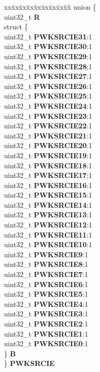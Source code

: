\begin{DoxyCompactItemize}
\begin{tabbing}
\end{tabbing}\item 
\mbox{\label{structCRP__tag_a831969641d81aa672d81f4381f4ee2cd}} 
\begin{tabbing}
xx\=xx\=xx\=xx\=xx\=xx\=xx\=xx\=xx\=\kill
union \{\\
\>uint32\_t {\bfseries R}\\
\>struct \{\\
\>\>uint32\_t {\bfseries PWKSRCIE31}:1\\
\>\>uint32\_t {\bfseries PWKSRCIE30}:1\\
\>\>uint32\_t {\bfseries PWKSRCIE29}:1\\
\>\>uint32\_t {\bfseries PWKSRCIE28}:1\\
\>\>uint32\_t {\bfseries PWKSRCIE27}:1\\
\>\>uint32\_t {\bfseries PWKSRCIE26}:1\\
\>\>uint32\_t {\bfseries PWKSRCIE25}:1\\
\>\>uint32\_t {\bfseries PWKSRCIE24}:1\\
\>\>uint32\_t {\bfseries PWKSRCIE23}:1\\
\>\>uint32\_t {\bfseries PWKSRCIE22}:1\\
\>\>uint32\_t {\bfseries PWKSRCIE21}:1\\
\>\>uint32\_t {\bfseries PWKSRCIE20}:1\\
\>\>uint32\_t {\bfseries PWKSRCIE19}:1\\
\>\>uint32\_t {\bfseries PWKSRCIE18}:1\\
\>\>uint32\_t {\bfseries PWKSRCIE17}:1\\
\>\>uint32\_t {\bfseries PWKSRCIE16}:1\\
\>\>uint32\_t {\bfseries PWKSRCIE15}:1\\
\>\>uint32\_t {\bfseries PWKSRCIE14}:1\\
\>\>uint32\_t {\bfseries PWKSRCIE13}:1\\
\>\>uint32\_t {\bfseries PWKSRCIE12}:1\\
\>\>uint32\_t {\bfseries PWKSRCIE11}:1\\
\>\>uint32\_t {\bfseries PWKSRCIE10}:1\\
\>\>uint32\_t {\bfseries PWKSRCIE9}:1\\
\>\>uint32\_t {\bfseries PWKSRCIE8}:1\\
\>\>uint32\_t {\bfseries PWKSRCIE7}:1\\
\>\>uint32\_t {\bfseries PWKSRCIE6}:1\\
\>\>uint32\_t {\bfseries PWKSRCIE5}:1\\
\>\>uint32\_t {\bfseries PWKSRCIE4}:1\\
\>\>uint32\_t {\bfseries PWKSRCIE3}:1\\
\>\>uint32\_t {\bfseries PWKSRCIE2}:1\\
\>\>uint32\_t {\bfseries PWKSRCIE1}:1\\
\>\>uint32\_t {\bfseries PWKSRCIE0}:1\\
\>\} {\bfseries B}\\
\} {\bfseries PWKSRCIE}\\


\end{tabbing}
\end{DoxyCompactItemize}
